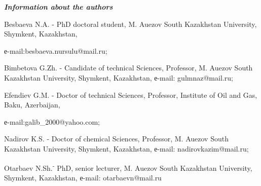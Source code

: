 \emph{{\bfseries Information about the authors}}

\begin{noparindent}
Besbaeva N.A. - PhD doctoral student, M. Auezov South Kazakhstan
University, Shymkent, Kazakhstan,

е-mail:besbaeva.nursulu@mail.ru;

Bimbetova G.Zh. - Candidate of technical Sciences, Professor, M. Auezov
South Kazakhstan University, Shymkent, Kazakhstan, е-mail:
gulmnaz@mail.ru;

Efendiev G.M. - Doctor of technical Sciences, Professor, Institute of
Oil and Gas, Baku, Azerbaijan,

е-mail:galib\_2000@yahoo.com;

Nadirov K.S. - Doctor of chemical Sciences, Professor, M. Auezov South
Kazakhstan University, Shymkent, Kazakhstan, е-mail:
nadirovkazim@mail.ru;

Otarbaev N.Sh.\textsuperscript{-} PhD, senior lecturer, M. Auezov South
Kazakhstan University, Shymkent, Kazakhstan, е-mail: otarbaevn@mail.ru
\end{noparindent}
